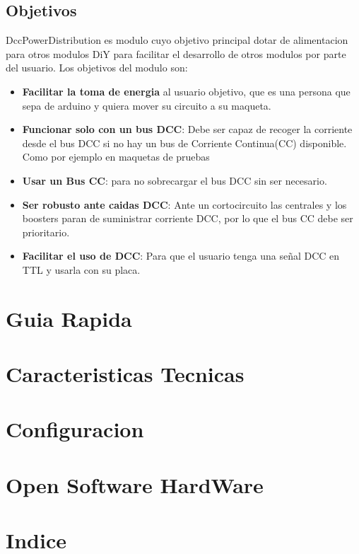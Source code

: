 \documentclass[spanish]{DccDiyTools/DccDiyTools}
\begin{document}
\subsection{Objetivos}
DccPowerDistribution es modulo cuyo objetivo principal dotar de alimentacion para otros modulos DiY
para facilitar el desarrollo de otros modulos por parte del usuario. Los objetivos del modulo son:
\begin{itemize}
    \item \textbf{Facilitar la toma de energia} al usuario objetivo, que es una persona que sepa
de arduino y quiera mover su circuito a su maqueta.   
    \item \textbf{Funcionar solo con un bus DCC}: Debe ser capaz de recoger la corriente desde el bus
DCC si no hay un bus de Corriente Continua(CC) disponible. Como por ejemplo en maquetas de pruebas
    \item \textbf{Usar un Bus CC}: para no sobrecargar el bus DCC sin ser necesario.
    \item \textbf{Ser robusto ante caidas DCC}: Ante un cortocircuito las centrales y los boosters 
paran de suministrar corriente DCC, por lo que el bus CC debe ser prioritario.
    \item \textbf{Facilitar el uso de DCC}: Para que el usuario tenga una señal DCC en TTL y usarla
con su placa.
\end{itemize}

\newpage
\section{Guia Rapida}


\newpage
\section{Caracteristicas Tecnicas}


\newpage
\section{Configuracion}


\newpage
\section{Open Software HardWare}

\newpage
\section{Indice}
\tableofcontents
\end{document}
